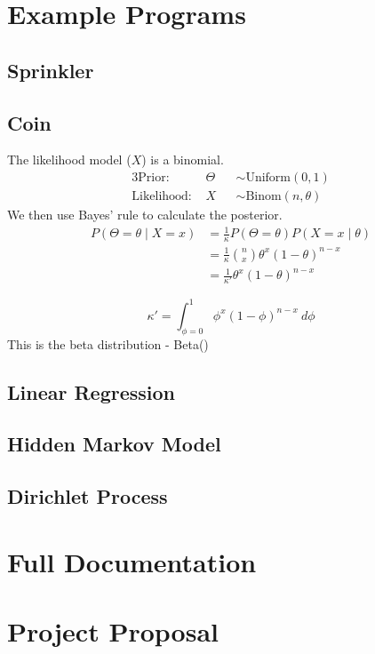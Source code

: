 \documentclass[12pt,notitlepage,a4paper]{report}
\begin{document}
\chapter{Example Programs} \label{app:examples}
\section{Sprinkler} \label{app:sprinkler}
\section{Coin} \label{app:coin}
The likelihood model ($X$) is a binomial.
% 
\begin{alignat*}{3}
	\text{Prior:~}      & \Theta &   & \sim \text{Uniform}(0,1)    \\
	\text{Likelihood:~} & X      &   & \sim \text{Binom}(n,\theta) 
\end{alignat*}
% 
We then use Bayes' rule to calculate the posterior.
\begin{align*}
	P(\Theta=\theta \mid X=x) & = \frac{1}{\kappa}P(\Theta=\theta)P(X=x\mid\theta)     \\ 
	                          & = \frac{1}{\kappa}\binom{n}{x}\theta^x(1-\theta)^{n-x} \\
	                          & = \frac{1}{\kappa'}\theta^x(1-\theta)^{n-x}            
\end{align*}

\[\kappa'=\int_{\phi=0}^1\phi^x(1-\phi)^{n-x}~d\phi\]
This is the beta distribution - Beta()
\section{Linear Regression} \label{app:linreg}
\section{Hidden Markov Model} \label{app:hmm}
\section{Dirichlet Process} \label{app:dp}

\chapter{Full Documentation} \label{app:docs}


\chapter{Project Proposal}

\end{document}
